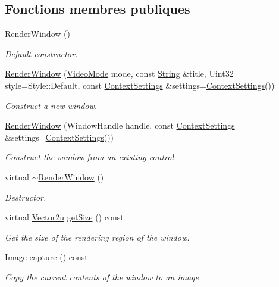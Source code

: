 \subsection*{Fonctions membres publiques}
\begin{DoxyCompactItemize}
\item 
\hyperlink{classsf_1_1RenderWindow_a839bbf336bdcafb084dafc3076fc9021}{Render\+Window} ()
\begin{DoxyCompactList}\small\item\em Default constructor. \end{DoxyCompactList}\item 
\hyperlink{classsf_1_1RenderWindow_aebef983e01f677bf5a66cefc4d547647}{Render\+Window} (\hyperlink{classsf_1_1VideoMode}{Video\+Mode} mode, const \hyperlink{classsf_1_1String}{String} \&title, Uint32 style=Style\+::\+Default, const \hyperlink{structsf_1_1ContextSettings}{Context\+Settings} \&settings=\hyperlink{structsf_1_1ContextSettings}{Context\+Settings}())
\begin{DoxyCompactList}\small\item\em Construct a new window. \end{DoxyCompactList}\item 
\hyperlink{classsf_1_1RenderWindow_a25c0af7d515e710b6eebc9c6be952aa5}{Render\+Window} (Window\+Handle handle, const \hyperlink{structsf_1_1ContextSettings}{Context\+Settings} \&settings=\hyperlink{structsf_1_1ContextSettings}{Context\+Settings}())
\begin{DoxyCompactList}\small\item\em Construct the window from an existing control. \end{DoxyCompactList}\item 
virtual \hyperlink{classsf_1_1RenderWindow_a3407e36bfc1752d723140438a825365c}{$\sim$\+Render\+Window} ()
\begin{DoxyCompactList}\small\item\em Destructor. \end{DoxyCompactList}\item 
virtual \hyperlink{classsf_1_1Vector2}{Vector2u} \hyperlink{classsf_1_1RenderWindow_ae3eacf93661c8068fca7a78d57dc7e14}{get\+Size} () const
\begin{DoxyCompactList}\small\item\em Get the size of the rendering region of the window. \end{DoxyCompactList}\item 
\hyperlink{classsf_1_1Image}{Image} \hyperlink{classsf_1_1RenderWindow_a5a784b8a09bf4a8bc97ef9e0a8957c35}{capture} () const
\begin{DoxyCompactList}\small\item\em Copy the current contents of the window to an image. \end{DoxyCompactList}\end{DoxyCompactItemize}
